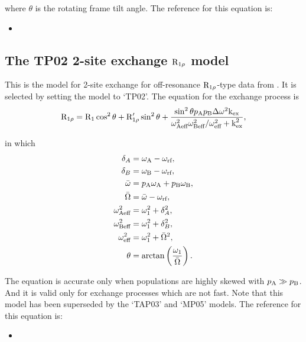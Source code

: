 where $\theta$ is the rotating frame tilt angle.  The reference for this equation is:
\begin{itemize}
\item {}
\end{itemize}



\subsection{The TP02 2-site exchange $\mathrm{R}_{1\rho}$ model}
\label{sect: dispersion: TP02 model}

This is the model for 2-site exchange for off-resonance $\mathrm{R}_{1\rho}$-type data from \citet{TrottPalmer02}.
It is selected by setting the model to `TP02'.
The equation for the exchange process is
\begin{equation}
    \mathrm{R}_{1\rho} = \mathrm{R}_1\cos^2\theta + \mathrm{R}_{1\rho}'\sin^2\theta + \frac{\sin^2\theta p_\textrm{A}p_\textrm{B}\Delta\omega^2\textrm{k}_\textrm{ex}}{\omega_\textrm{Aeff}^2\omega_\textrm{Beff}^2/\omega_\textrm{eff}^2 + \textrm{k}_\textrm{ex}^2},
\end{equation}

in which
\begin{subequations}
\begin{align}
    \delta_A &= \omega_\textrm{A} - \omega_\textrm{rf}, \\
    \delta_B &= \omega_\textrm{B} - \omega_\textrm{rf}, \\
    \bar\omega &= p_\textrm{A}\omega_\textrm{A} + p_\textrm{B}\omega_\textrm{B}, \\
    \bar\Omega &= \bar\omega - \omega_\textrm{rf}, \\
    \omega_\textrm{Aeff}^2 &= \omega_1^2 + \delta_A^2, \\
    \omega_\textrm{Beff}^2 &= \omega_1^2 + \delta_B^2, \\
    \omega_\textrm{eff}^2 &= \omega_1^2 + \bar\Omega^2, \\
    \theta &= \arctan \left( \frac{\omega_1}{\bar\Omega} \right).
\end{align}
\end{subequations}

The equation is accurate only when populations are highly skewed with $p_\textrm{A} \gg p_\textrm{B}$.
And it is valid only for exchange processes which are not fast.
Note that this model has been superseded by the `TAP03' and `MP05' models.
The reference for this equation is:
\begin{itemize}
\item {}
\end{itemize}


